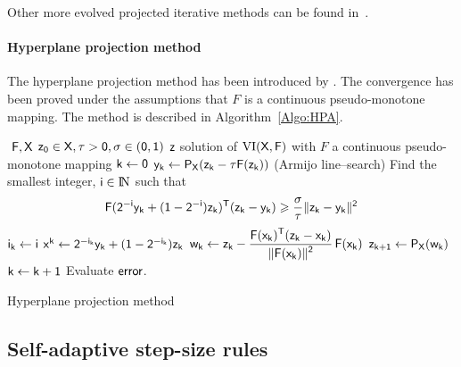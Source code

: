 Other more evolved projected iterative methods can be found in~\citep{He.ea_COA2012-I,He.ea_COA2012-II}.

\paragraph{Hyperplane projection method}
The hyperplane projection method has been introduced by \citep{Konnov1993}. The convergence has been proved under the assumptions that $F$ is  a continuous pseudo-monotone mapping. The method is described in Algorithm~\ref{Algo:HPA}.
\begin{algorithm}
  \begin{algorithmic}
    {\sf
      \STATE $ $
      \REQUIRE $\sf F,X$
      \REQUIRE $\sf z_0 \in X, \tau >0, \sigma \in (0,1)$
      \ENSURE  $\sf z$ solution of $\sf \mathrm{VI}(X,F)$ with $F$ a continuous pseudo-monotone mapping
      \STATE   $\sf k \leftarrow 0$ 
      \STATE $\sf y_k \leftarrow  P_X(z_k-\tau F(z_k))$
      \STATE (Armijo line--search) Find the smallest integer, $\sf i\in \mathrm{I\!N}$ such that 
      \begin{equation}
        \label{eq:HPA1}
        \sf  F(2^{-i}y_k+(1-2^{-i})z_k)^T (z_k-y_k) \geq \Frac \sigma \tau \|z_k-y_k\|^2
      \end{equation}
      \STATE $\sf i_k \leftarrow i$
      \STATE $\sf x^k \leftarrow 2^{-i_k}y_k+(1-2^{-i_k})z_k$
      \STATE $\sf w_k \leftarrow  z_k - {\displaystyle \frac{\displaystyle F(x_k)^T(z_k-x_k)}{\displaystyle \|F(x_k)\|^2}}\,F(x_k)$
      \STATE $\sf z_{k+1}  \leftarrow P_{X}(w_k)$
      \STATE $\sf k \leftarrow k+1$
      \STATE Evaluate $\sf error$.
      \ENDWHILE
    }
  \end{algorithmic}
  \caption{Hyperplane projection method \citep{Konnov1993}}  \label{Algo:HPA}
\end{algorithm}

\subsection{Self-adaptive step-size rules}
\label{sec:numericalmethods,vi,adaptive}

